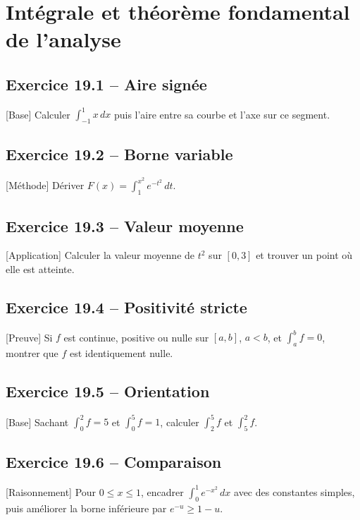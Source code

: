 \chapter{Intégrale et théorème fondamental de l’analyse}
\section*{Exercice 19.1 -- Aire signée}
[Base] Calculer $\int_{-1}^1x\,dx$ puis l'aire entre sa courbe et l'axe sur ce segment.

\section*{Exercice 19.2 -- Borne variable}
[Méthode] Dériver $F(x)=\int_1^{x^2}e^{-t^2}\,dt$.

\section*{Exercice 19.3 -- Valeur moyenne}
[Application] Calculer la valeur moyenne de $t^2$ sur $[0,3]$ et trouver un point où elle est atteinte.

\section*{Exercice 19.4 -- Positivité stricte}
[Preuve] Si $f$ est continue, positive ou nulle sur $[a,b]$, $a<b$, et $\int_a^bf=0$, montrer que $f$ est identiquement nulle.

\section*{Exercice 19.5 -- Orientation}
[Base] Sachant $\int_0^2f=5$ et $\int_0^5f=1$, calculer $\int_2^5f$ et $\int_5^2f$.

\section*{Exercice 19.6 -- Comparaison}
[Raisonnement] Pour $0\le x\le1$, encadrer $\int_0^1e^{-x^2}\,dx$ avec des constantes simples, puis améliorer la borne inférieure par $e^{-u}\ge1-u$.
